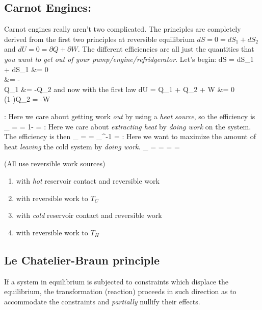 \documentclass[12pt]{article}
\begin{document}
\subsection{Carnot Engines:}
Carnot engines really aren't two complicated.  The principles are completely derived from the first two principles at reversible equilibrium $dS = 0 = dS_1 + dS_2$ and $dU = 0 = \partial Q + \partial W$.  The different efficiencies are all just the quantities that \emph{you want to get out of your pump/engine/refridgerator}.  Let's begin:
\eqs
dS = dS_1 + dS_1 &= 0\\
 &= -\\
\partial Q_1 &= -\partial Q_2 
\eqe
and now with the first law
\eqs
dU = \partial Q_1 + \partial Q_2 + \partial W &= 0\\
(1-)\partial Q_2 = -\partial W
\eqe

:  Here we care about getting work \emph{out} by using a \emph{heat source}, so the efficiency is
\eqs
\mu_ =  = 1- = 
\eqe
{}: Here we care about \emph{extracting heat} by \emph{doing work} on the system.  The efficiency is then
\eqs
\mu_ =  = \mu_^{-1} = 
\eqe
{}: Here we want to maximize the amount of heat \emph{leaving} the cold system by \emph{doing work}.
\eqs
\mu_ =  = =  = 
\eqe

 (All use reversible work sources)
\begin{enumerate}
\item {} with \emph{hot} reservoir contact and reversible work
\item {} with reversible work to $T_C$
\item {} with \emph{cold} reservoir contact and reversible work
\item {} with reversible work to $T_H$
\end{enumerate}

\subsection{Le Chatelier-Braun principle}
 If a system in equilibrium is subjected to constraints which displace the equilibrium, the transformation (reaction) proceeds in such  direction as to accommodate the constraints and \emph{partially} nullify their effects.
\end{document}
